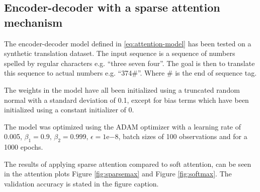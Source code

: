 \subsection{Encoder-decoder with a sparse attention mechanism}
The encoder-decoder model defined in \eqref{eq:attention-model} has been tested on a synthetic translation dataset. The input sequence is a sequence of numbers spelled by regular characters e.g. ``three seven four''. The goal is then to translate this sequence to actual numbers e.g. ``374\#''. Where \# is the end of sequence tag.

The weights in the model have all been initialized using a truncated random normal with a standard deviation of 0.1, except for bias terms which have been initialized using a constant initializer of 0.

The model was optimized using the ADAM optimizer with a learning rate of 0.005, $\beta_1=0.9, \, \beta_2 = 0.999, \, \epsilon = 1\mathrm{e}{-8}$, batch sizes of 100 observations and for a 1000 epochs.

The results of applying sparse attention compared to soft attention, can be seen in the attention plots Figure \ref{fig:sparsemax} and Figure \ref{fig:softmax}. The validation accuracy is stated in the figure caption.

